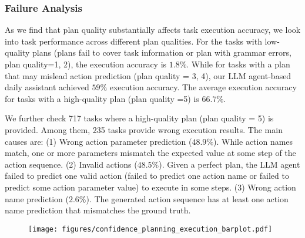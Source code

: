 \subsubsection{Failure Analysis}
\label{sec-failure-analysis}
As we find that plan quality substantially affects task execution accuracy, we look into task performance across different plan qualities. 
For the tasks with low-quality plans (plans fail to cover task information or plan with grammar errors, \ie plan quality=1, 2), the execution accuracy is $1.8\%$. 
While for tasks with a plan that may mislead action prediction (plan quality = 3, 4), our LLM agent-based daily assistant achieved $59\%$ execution accuracy. 
The average execution accuracy for tasks with a high-quality plan (plan quality =5) is $66.7\%$.

We further check 717 tasks where a high-quality plan (plan quality = 5) is provided. Among them, 235 tasks provide wrong execution results. The main causes are: 
(1) Wrong action parameter prediction ($48.9\%$). 
While action names match, one or more parameters mismatch the expected value at some step of the action sequence. 
(2) Invalid actions ($48.5\%$). Given a perfect plan, the LLM agent failed to predict one valid action (failed to predict one action name or failed to predict some action parameter value) to execute in some steps. 
(3) Wrong action name prediction ($2.6\%$). The generated action sequence has at least one action name prediction that mismatches the ground truth. %

\begin{figure}[h]
    \centering
    \texttt{[image: figures/confidence\_planning\_execution\_barplot.pdf]}
    \caption{} 
    \label{fig:confidence}
\end{figure}

